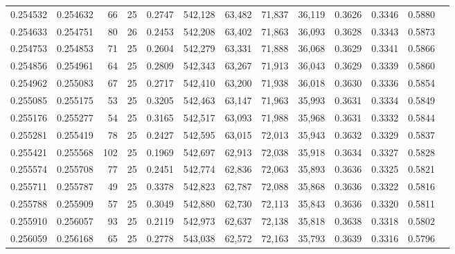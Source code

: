 \begin{tabular}{rrrrrrrrrrrrr}
0.254532 & 0.254632 &    66 &  25 &                                     0.2747 & 542,128 &  63,482 &  71,837 &  36,119 & 0.3626 & 0.3346 & 0.5880 \\
0.254633 & 0.254751 &    80 &  26 &                                     0.2453 & 542,208 &  63,402 &  71,863 &  36,093 & 0.3628 & 0.3343 & 0.5873 \\
0.254753 & 0.254853 &    71 &  25 &                                     0.2604 & 542,279 &  63,331 &  71,888 &  36,068 & 0.3629 & 0.3341 & 0.5866 \\
0.254856 & 0.254961 &    64 &  25 &                                     0.2809 & 542,343 &  63,267 &  71,913 &  36,043 & 0.3629 & 0.3339 & 0.5860 \\
0.254962 & 0.255083 &    67 &  25 &                                     0.2717 & 542,410 &  63,200 &  71,938 &  36,018 & 0.3630 & 0.3336 & 0.5854 \\
0.255085 & 0.255175 &    53 &  25 &                                     0.3205 & 542,463 &  63,147 &  71,963 &  35,993 & 0.3631 & 0.3334 & 0.5849 \\
0.255176 & 0.255277 &    54 &  25 &                                     0.3165 & 542,517 &  63,093 &  71,988 &  35,968 & 0.3631 & 0.3332 & 0.5844 \\
0.255281 & 0.255419 &    78 &  25 &                                     0.2427 & 542,595 &  63,015 &  72,013 &  35,943 & 0.3632 & 0.3329 & 0.5837 \\
0.255421 & 0.255568 &   102 &  25 &                                     0.1969 & 542,697 &  62,913 &  72,038 &  35,918 & 0.3634 & 0.3327 & 0.5828 \\
0.255574 & 0.255708 &    77 &  25 &                                     0.2451 & 542,774 &  62,836 &  72,063 &  35,893 & 0.3636 & 0.3325 & 0.5821 \\
0.255711 & 0.255787 &    49 &  25 &                                     0.3378 & 542,823 &  62,787 &  72,088 &  35,868 & 0.3636 & 0.3322 & 0.5816 \\
0.255788 & 0.255909 &    57 &  25 &                                     0.3049 & 542,880 &  62,730 &  72,113 &  35,843 & 0.3636 & 0.3320 & 0.5811 \\
0.255910 & 0.256057 &    93 &  25 &                                     0.2119 & 542,973 &  62,637 &  72,138 &  35,818 & 0.3638 & 0.3318 & 0.5802 \\
0.256059 & 0.256168 &    65 &  25 &                                     0.2778 & 543,038 &  62,572 &  72,163 &  35,793 & 0.3639 & 0.3316 & 0.5796 \\

\end{tabular}
